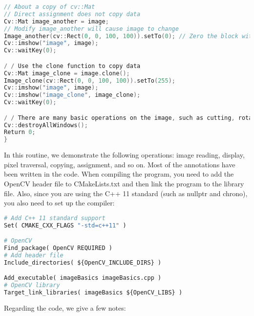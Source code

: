\begin{lstlisting}[language=C++,caption=slambook/ch5/imageBasics/imageBasics.cpp]
// About a copy of cv::Mat
// Direct assignment does not copy data
Cv::Mat image_another = image;
// Modify image_another will cause image to change
Image_another(cv::Rect(0, 0, 100, 100)).setTo(0); // Zero the block with the top left corner of 100*100
Cv::imshow("image", image);
Cv::waitKey(0);

/ / Use the clone function to copy data
Cv::Mat image_clone = image.clone();
Image_clone(cv::Rect(0, 0, 100, 100)).setTo(255);
Cv::imshow("image", image);
Cv::imshow("image_clone", image_clone);
Cv::waitKey(0);

/ / There are many basic operations on the image, such as cutting, rotating, scaling, etc., limited to the space will not be introduced one by one, please refer to the OpenCV official documentation to query the calling method of each function.
Cv::destroyAllWindows();
Return 0;
}
\end{lstlisting}

In this routine, we demonstrate the following operations: image reading, display, pixel traversal, copying, assignment, and so on. Most of the annotations have been written in the code. When compiling the program, you need to add the OpenCV header file to CMakeLists.txt and then link the program to the library file. Also, since you are using the C++ 11 standard (such as nullptr and chrono), you also need to set up the compiler:

\begin{lstlisting}[language=Python,caption=slambook/ch5/imageBasics/CMakeLists.txt]
# Add C++ 11 standard support
Set( CMAKE_CXX_FLAGS "-std=c++11" )

# OpenCV
Find_package( OpenCV REQUIRED )
# Add header file
Include_directories( ${OpenCV_INCLUDE_DIRS} )

Add_executable( imageBasics imageBasics.cpp )
# OpenCV library
Target_link_libraries( imageBasics ${OpenCV_LIBS} )
\end{lstlisting}

Regarding the code, we give a few notes:

